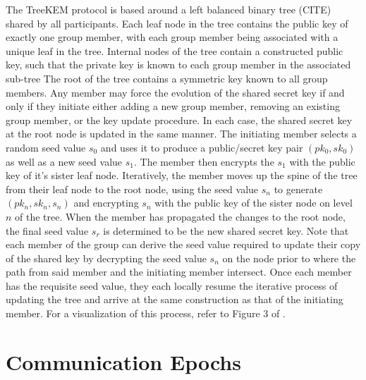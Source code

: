 The TreeKEM protocol is based around a left balanced binary tree (CITE) shared by all participants.
Each leaf node in the tree contains the public key of exactly one group member, with each group member being associated with a unique leaf in the tree.
Internal nodes of the tree contain a constructed public key, such that the private key is known to each group member in the associated sub-tree
The root of the tree contains a symmetric key known to all group members.
Any member may force the evolution of the shared secret key if and only if they initiate either adding a new group member, removing an existing group member, or the key update procedure.
In each case, the shared secret key at the root node is updated in the same manner.
The initiating member selects a random seed value \(s_0\) and uses it to produce a public/secret key pair \((pk_0,sk_0)\) as well as a new seed value \(s_1\).
The member then encrypts the \(s_1\) with the public key of it's sister leaf node.
Iteratively, the member moves up the spine of the tree from their leaf node to the root node, using the seed value \(s_n\) to generate \((pk_n,sk_n,s_n)\) and encrypting \(s_n\) with the public key of the sister node on level \(n\) of the tree.
When the member has propagated the changes to the root node, the final seed value \(s_r\) is determined to be the new shared secret key.
Note that each member of the group can derive the seed value required to update their copy of the shared key by decrypting the seed value \(s_n\) on the node prior to where the path from said member and the initiating member intersect.
Once each member has the requisite seed value, they each locally resume the iterative process of updating the tree and arrive at the same construction as that of the initiating member.
For a visualization of this process, refer to Figure 3 of \autocite{alwen2020security}.


\hypertarget{communication-epochs}{%
\section{Communication Epochs}\label{communication-epochs}}

